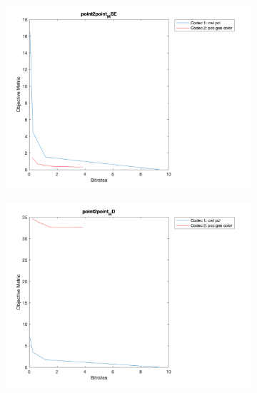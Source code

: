 \documentclass{article}
\begin{document}
\begin{figure}
    \centering
    \begin{subfigure}[b]{0.65\textwidth}
    \includegraphics[width=\textwidth]{Figures/task2/rhetorician_p2p_mse.png}
    \end{subfigure}

    \begin{subfigure}[b]{0.65\textwidth}
    \includegraphics[width=\textwidth]{Figures/task2/rhetorician_p2p_hd.png}
    \end{subfigure}


\end{figure}
\end{document}
